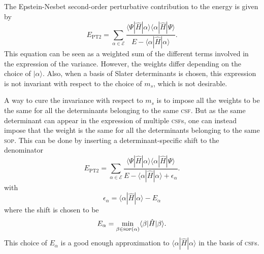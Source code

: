 \documentclass[aip,jcp,reprint,showkeys]{revtex4-1}
\newcommand{\ket}[1]{|#1\rangle}
\newcommand{\sop}{\textsc{sop}}
\newcommand{\csf}{\textsc{csf}}
\newcommand{\mel}[3]{\langle #1 | #2 | #3 \rangle}
\newcommand{\ept}{E_\text{PT2}}
\begin{document}
The Epstein-Nesbet second-order perturbative contribution to the energy is given
by
\begin{equation}
\ept = \sum_{\alpha \in \mathcal{E}} \frac{\mel{\Psi}{\hat{H}}{\alpha}\mel{\alpha}{\hat{H}}{\Psi}}{E-\mel{\alpha}{\hat{H}}{\alpha}}.
\label{eq:pt2}
\end{equation}
This equation can be seen as a weighted sum of the different terms involved in
the expression of the variance. However, the weights differ depending on the
choice of $\ket{\alpha}$. Also, when a basis of Slater determinants is chosen,
this expression is not invariant with respect to the choice of $m_s$, which
is not desirable.

A way to cure the invariance with respect to $m_s$ is to impose all the weights
to be the same for all the determinants belonging to the same \csf . But as 
the same determinant can appear in the expression of multiple \csf s, one can
instead impose that the weight is the same for all the determinants belonging
to the same \sop .  This can be done by inserting a determinant-specific shift
to the denominator 
\begin{equation}
\ept = \sum_{\alpha \in \mathcal{E}} \frac{\mel{\Psi}{\hat{H}}{\alpha}\mel{\alpha}{\hat{H}}{\Psi}}{E-\mel{\alpha}{\hat{H}}{\alpha}+\epsilon_\alpha}.
\end{equation}
with
\begin{equation}
\epsilon_\alpha = \mel{\alpha}{\hat{H}}{\alpha} - E_\alpha
\end{equation}
where the shift is chosen to be
\begin{equation}
E_\alpha = \min_{\beta \in \text{\sop}(\alpha)} \mel{\beta}{\hat{H}}{\beta}.
\end{equation}
This choice of $E_\alpha$ is a good enough approximation to
$\mel{\alpha}{\hat{H}}{\alpha}$ in the basis of \csf s.
\end{document}
